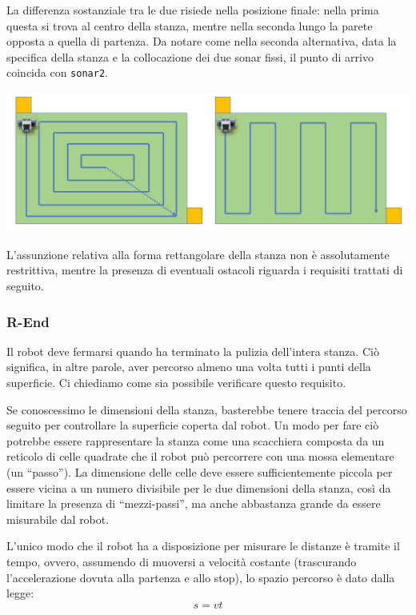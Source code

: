 \documentclass{../llncs}
\newcommand{\code}[1]{{\color{blue}\small{\texttt{#1}}}}
\begin{document}
La differenza sostanziale tra le due risiede nella posizione finale: nella prima questa si trova al centro della stanza, mentre nella seconda lungo la parete opposta a quella di partenza. Da notare come nella seconda alternativa, data la specifica della stanza e la collocazione dei due sonar fissi, il punto di arrivo coincida con \code{sonar2}.\\

\begin{center}
\includegraphics[scale=0.4]{img/roomMap.png}
\end{center}

L'assunzione relativa alla forma rettangolare della stanza non è assolutamente restrittiva, mentre la presenza di eventuali ostacoli riguarda i requisiti trattati di seguito.

\subsubsection{R-End}
Il robot deve fermarsi quando ha terminato la pulizia dell'intera stanza. Ciò significa, in altre parole, aver percorso almeno una volta tutti i punti della superficie. Ci chiediamo come sia possibile verificare questo requisito.

Se conoscessimo le dimensioni della stanza, basterebbe tenere traccia del percorso seguito per controllare la superficie coperta dal robot. Un modo per fare ciò potrebbe essere rappresentare la stanza come una scacchiera composta da un reticolo di celle quadrate che il robot può percorrere con una mossa elementare (un ``passo''). La dimensione delle celle deve essere sufficientemente piccola per essere vicina a un numero divisibile per le due dimensioni della stanza, così da limitare la presenza di ``mezzi-passi'', ma anche abbastanza grande da essere misurabile dal robot.

L'unico modo che il robot ha a disposizione per misurare le distanze è tramite il tempo, ovvero, assumendo di muoversi a velocità costante (trascurando l'accelerazione dovuta alla partenza e allo stop), lo spazio percorso è dato dalla legge:
\[s = v t \]
\end{document}
